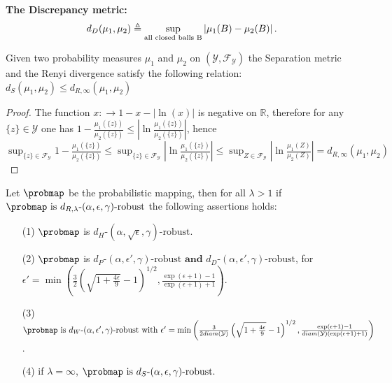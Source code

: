 \textbf{The Discrepancy metric:}
$$d_{D}(\mu_1,\mu_2) \triangleq \underset{\textnormal{all closed balls B}}{\sup} \left| \mu_1(B) - \mu_2(B) \right|.$$

\begin{lemma}\label{lemma:separation-appendix}
Given two probability measures $\mu_1$ and $\mu_2$ on $(\mathcal{Y},\mathcal{F}_{\mathcal{Y}})$  the Separation metric and the Renyi divergence satisfy the following relation: $d_S(\mu_1,\mu_2) \leq d_{R,\infty}(\mu_1,\mu_2)$
\end{lemma}

\begin{proof}
The function $x: \to 1-x - \left|\ln(x)\right|$ is negative on $\mathbb{R}$, therefore for any $\{z\} \in \mathcal{Y}$ one has $1-\frac{\mu_1(\{z\})}{\mu_2(\{z\})} \leq \left|\ln\frac{\mu_1(\{z\})}{\mu_2(\{z\})}\right|$, hence $\sup_{\{z\} \in \mathcal{F}_{\mathcal{Y}}} 1-\frac{\mu_1(\{z\})}{\mu_2(\{z\})} \leq \sup_{\{z\} \in \mathcal{F}_{\mathcal{Y}}}\left|\ln\frac{\mu_1(\{z\})}{\mu_2(\{z\})}\right| \leq \sup_{Z \in \mathcal{F}_{\mathcal{Y}}}\left|\ln\frac{\mu_1(Z)}{\mu_2(Z)}\right| = d_{R,\infty}(\mu_1,\mu_2)$
\end{proof}

\begin{theorem}
Let $\probmap$ be the probabilistic mapping, then for all $\lambda >1$ if $\probmap \text{ is }  d_{R,\lambda}\text{-}(\alpha, \epsilon, \gamma)\text{-robust}$ 
the following assertions holds:
\begin{itemize}
\item[(1)] $\probmap$ is $d_{H}\text{-}(\alpha, \sqrt{\epsilon}, \gamma)\text{-robust}.$
\item[(2)] $\probmap$ is $d_{P}\text{-}(\alpha, \epsilon', \gamma)\text{-robust} \textbf{ and } d_{D}\text{-}(\alpha, \epsilon', \gamma)\text{-robust}$, for $\epsilon' = \min \left(\frac{3}{2}\left(\sqrt{1 + \frac{4\epsilon}{9}} - 1\right)^{1/2}, \frac{\exp(\epsilon +1) -1}{\exp(\epsilon +1) +1}\right).$
\item[(3)] $\probmap \text{ is } d_{W}\text{-}(\alpha, \epsilon', \gamma)\text{-robust} \text{ with }\epsilon' = \min \left(\frac{3}{2 diam(\mathcal{Y})}\left(\sqrt{1 + \frac{4\epsilon}{9}} - 1\right)^{1/2}, \frac{\exp(\epsilon +1) -1}{ diam(\mathcal{Y}) (\exp(\epsilon +1) +1)}\right)$.
\item[(4)] if $\lambda =\infty$, $ \probmap \text{ is } d_{S}\text{-}(\alpha, \epsilon, \gamma)\text{-robust}.$
\end{itemize}
\end{theorem}


